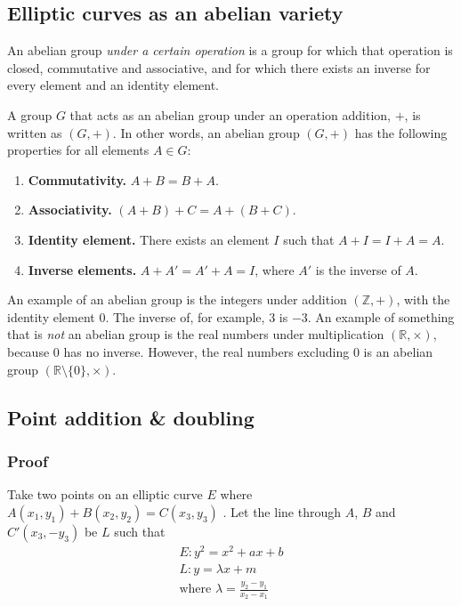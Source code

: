 \documentclass[a4paper]{article}
\begin{document}
\subsection{Elliptic curves as an abelian variety}

An abelian group \textit{under a certain operation} is a group for which that operation is closed, commutative and associative, and for which there exists an inverse for every element and an identity element.\cite[11]{wp}

A group $G$ that acts as an abelian group under an operation addition, $+$, is written as $(G, +)$. In other words, an abelian group $(G, +)$ has the following properties for all elements $A \in G$:\cite[11]{guide}
\begin{enumerate}
    \item \textbf{Commutativity.} $A + B = B + A$.
    \item \textbf{Associativity.} $(A + B) + C = A + (B + C)$.
    \item \textbf{Identity element.} There exists an element $I$ such that $A + I = I + A = A$.
    \item \textbf{Inverse elements.} $A + A' = A' + A = I$, where $A'$ is the inverse of $A$.
\end{enumerate}

An example of an abelian group is the integers under addition $(\mathbb{Z}, +)$, with the identity element $0$. The inverse of, for example, $3$ is $-3$. An example of something that is \textit{not} an abelian group is the real numbers under multiplication $(\mathbb{R}, \times)$, because $0$ has no inverse. However, the real numbers excluding $0$ is an abelian group $(\mathbb{R} \setminus \{0\}, \times)$.

\subsection{Point addition \& doubling}

\subsubsection{Proof}

Take two points on an elliptic curve $E$ where $A(x_1, y_1) + B(x_2, y_2) = C(x_3, y_3)$ . Let the line through $A$, $B$ and $C'(x_3, -y_3)$ be $L$ such that
\begin{gather*}
    E: y^2 = x^2 + ax + b \\
    L: y = \lambda x + m \\
    \text{where } \lambda = \frac{y_2-y_1}{x_2-x_1}
\end{gather*}
\end{document}
